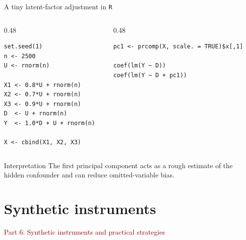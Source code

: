 \documentclass[dvipsnames,aspectratio=169,handout]{beamer}
\begin{document}
\begin{frame}[fragile]{A tiny latent-factor adjustment in \texttt{R}}
\begin{columns}[T,onlytextwidth]
\begin{column}{0.48\textwidth}
\begin{lstlisting}
set.seed(1)
n <- 2500
U <- rnorm(n)

X1 <- 0.8*U + rnorm(n)
X2 <- 0.7*U + rnorm(n)
X3 <- 0.9*U + rnorm(n)
D  <- U + rnorm(n)
Y  <- 1.0*D + U + rnorm(n)

X <- cbind(X1, X2, X3)
\end{lstlisting}
\end{column}
\begin{column}{0.48\textwidth}
\begin{lstlisting}
pc1 <- prcomp(X, scale. = TRUE)$x[,1]

coef(lm(Y ~ D))
coef(lm(Y ~ D + pc1))
\end{lstlisting}
\end{column}
\end{columns}

\begin{alertblock}{Interpretation}
The first principal component acts as a rough estimate of the hidden confounder and can reduce omitted-variable bias.
\end{alertblock}
\end{frame}


\section{Synthetic instruments}

\begin{frame}{}
\begin{center}
{\Huge \textcolor{DarkRed}{Part 6: Synthetic instruments and practical strategies}}
\end{center}
\end{frame}
\end{document}
